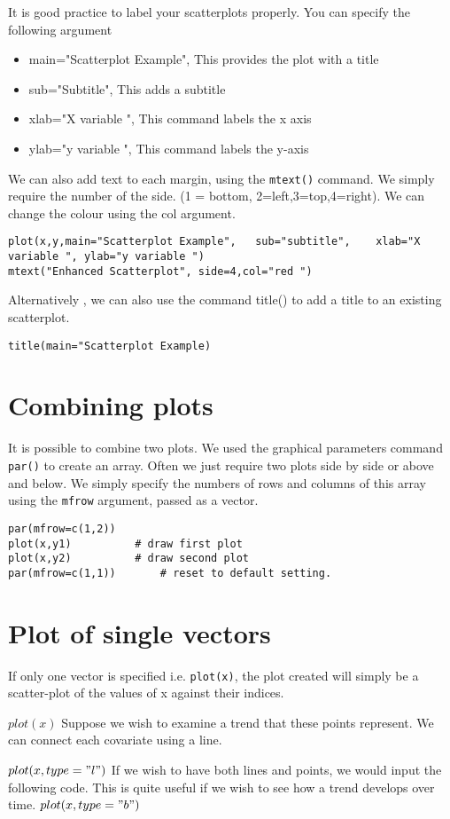 It is good practice to label your scatterplots properly. You can specify the following argument
\begin{itemize}
\item	main="Scatterplot Example", 	This provides the plot with a title
\item	sub="Subtitle",                 This adds a subtitle
\item	xlab="X variable ",				This command labels the x axis
\item   ylab="y variable ",				This command labels the y-axis
\end{itemize}
We can also add text to each margin, using the \texttt{mtext()} command.
We simply require the number of the side. (1 = bottom, 2=left,3=top,4=right).
We can change the colour using the col argument.
\footnotesize \begin{verbatim}
plot(x,y,main="Scatterplot Example",   sub="subtitle",    xlab="X variable ", ylab="y variable ")	
mtext("Enhanced Scatterplot", side=4,col="red ")
\end{verbatim}\normalsize
Alternatively , we can also use the command title() to add a title to an existing scatterplot.
\footnotesize \begin{verbatim}
title(main="Scatterplot Example)	
\end{verbatim}\normalsize


\section{Combining plots}
It is possible to combine two plots. We used the graphical parameters command \texttt{par()} to create an array.
Often we just require two plots side by side or above and below. We simply specify the numbers of rows and columns of this array using the \texttt{mfrow} argument, passed as a vector.

\begin{verbatim}
par(mfrow=c(1,2))
plot(x,y1)			# draw first plot
plot(x,y2)			# draw second plot
par(mfrow=c(1,1))		# reset to default setting.
\end{verbatim}




\section{Plot of single vectors}
If only one vector is specified i.e. \texttt{plot(x)},  the plot created will simply be a scatter-plot of the values of x against their indices.

$plot(x)$
Suppose we wish to examine a trend that these points represent. We can connect each covariate using a line.

$plot(x, type = "l")$
If we wish to have both lines and points, we would input the following code. This is quite useful if we wish to see how a trend develops over time.
$plot(x, type = "b")$


